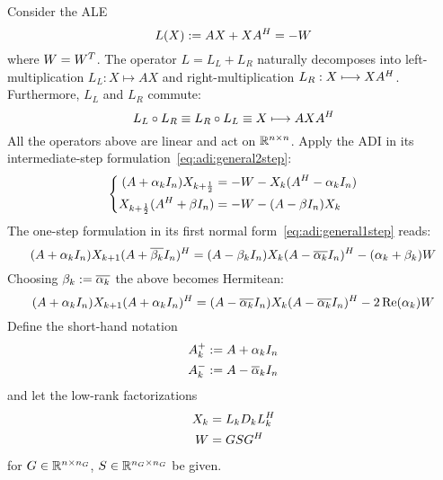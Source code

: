 Consider the \ac{ALE}
\begin{equation*}
\label{eq:adi:ale}
  L(X) := AX + XA^H = -W
\end{equation*}
where $W = W^T$.
The \Lyapunov operator $L = L_L + L_R$ naturally decomposes into
left-multiplication $L_L : X \mapsto AX$ and
right-multiplication $L_R : X \longmapsto XA^H$.
Furthermore, $L_L$ and $L_R$ commute:
\begin{equation*}
  L_L \circ L_R \equiv L_R \circ L_L \equiv X \longmapsto AXA^H
\end{equation*}
All the operators above are linear and act on $\mathbb{R}^{n\times n}$.
Apply the \ac{ADI} in its intermediate-step formulation~\eqref{eq:adi:general2step}:
\begin{equation}
  \left\{
  \begin{aligned}
    (A + \alpha_k I_n) X_{k+\frac{1}{2}} &= -W - X_k (A^H - \alpha_k I_n) \\
    X_{k+\frac{1}{2}} (A^H + \beta I_n) &= -W - (A - \beta I_n) X_k
  \end{aligned}
  \right.
\end{equation}
The one-step formulation in its first normal form~\eqref{eq:adi:general1step} reads:
\begin{equation}
  (A + \alpha_k I_n)
  X_{k+1}
  (A + \conj{\beta_k} I_n)^\HT
  =
  (A - \beta_k I_n)
  X_k
  (A - \conj{\alpha_k} I_n)^\HT
  - (\alpha_k + \beta_k)
  W
\end{equation}
Choosing $\beta_k := \conj{\alpha_k}$
the above becomes Hermitean:
\begin{equation}
\label{eq:adi:ale1step}
  (A + \alpha_k I_n)
  X_{k+1}
  (A + \alpha_k I_n)^\HT
  =
  (A - \conj{\alpha_k} I_n)
  X_k
  (A - \conj{\alpha_k} I_n)^\HT
  - 2\Re(\alpha_k)
  W
\end{equation}
Define the short-hand notation
\begin{equation*}
\begin{aligned}
  A^+_k &:= A + \alpha_k I_n \\
  A^-_k &:= A - \conj\alpha_k I_n
\end{aligned}
\end{equation*}
and let the low-rank factorizations
\begin{equation*}
\begin{aligned}
  X_k &= L_k D_k L_k^H \\
  W &= GSG^H
\end{aligned}
\end{equation*}
for $G\in\mathbb{R}^{n\times n_G}$, $S\in\mathbb{R}^{n_G\times n_G}$ be given.
